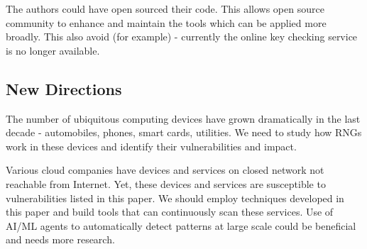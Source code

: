 \documentclass[12pt]{article}
\begin{document}
    The authors could have open sourced their code. This allows open source community to enhance and maintain the tools which can be applied more broadly. This also avoid (for example) - currently the online key checking service is no longer available.

    \subsection*{New Directions}
    The number of ubiquitous computing devices have grown dramatically in the last decade - automobiles, phones, smart cards, utilities. We need to study how RNGs work in these devices and identify their vulnerabilities and impact.

    Various cloud companies have devices and services on closed network not reachable from Internet. Yet, these devices and services are susceptible to vulnerabilities listed in this paper. We should employ techniques developed in this paper and build tools that can continuously scan these services. Use of AI/ML agents to automatically detect patterns at large scale could be beneficial and needs more research.
\end{document}
